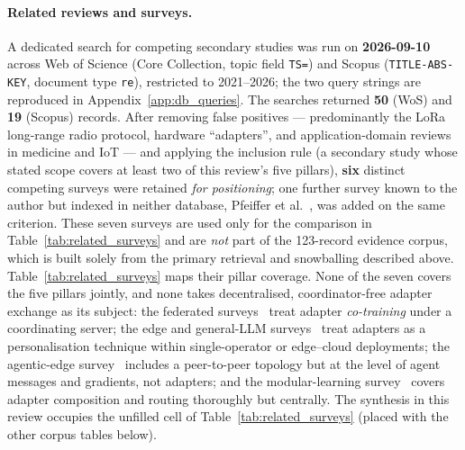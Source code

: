 \paragraph{Related reviews and surveys.}
A dedicated search for competing secondary studies was run on \textbf{2026-09-10}
across Web of Science (Core Collection, topic field \texttt{TS=}) and Scopus
(\texttt{TITLE-ABS-KEY}, document type \texttt{re}), restricted to 2021--2026;
the two query strings are reproduced in Appendix~\ref{app:db_queries}. The
searches returned \textbf{50} (WoS) and \textbf{19} (Scopus) records. After
removing false positives --- predominantly the LoRa long-range radio protocol,
hardware ``adapters'', and application-domain reviews in medicine and IoT ---
and applying the inclusion rule (a secondary study whose stated scope covers at
least two of this review's five pillars), \textbf{six} distinct competing
surveys were retained \emph{for positioning}; one further survey known to the
author but indexed in neither database, Pfeiffer et
al.~\cite{PfeifferModular2023}, was added on the same criterion. These seven
surveys are used only for the comparison in Table~\ref{tab:related_surveys} and
are \emph{not} part of the 123-record evidence corpus, which is built solely
from the primary retrieval and snowballing described above.
Table~\ref{tab:related_surveys} maps their pillar coverage.
None of the seven covers the five pillars jointly, and none takes
decentralised, coordinator-free adapter exchange as its subject: the federated
surveys~\cite{WoisetschlagerFLsurvey2024,YangFedLoRAsurvey2025} treat adapter
\emph{co-training} under a coordinating server; the edge and general-LLM
surveys~\cite{JiangEdgeLLM2026,LukacLLMsurvey2026} treat adapters as a
personalisation technique within single-operator or edge--cloud deployments;
the agentic-edge survey~\cite{DibAgenticEdge2026} includes a peer-to-peer
topology but at the level of agent messages and gradients, not adapters; and
the modular-learning survey~\cite{PfeifferModular2023} covers adapter
composition and routing thoroughly but centrally. The synthesis in this review
occupies the unfilled cell of Table~\ref{tab:related_surveys} (placed with the
other corpus tables below).

